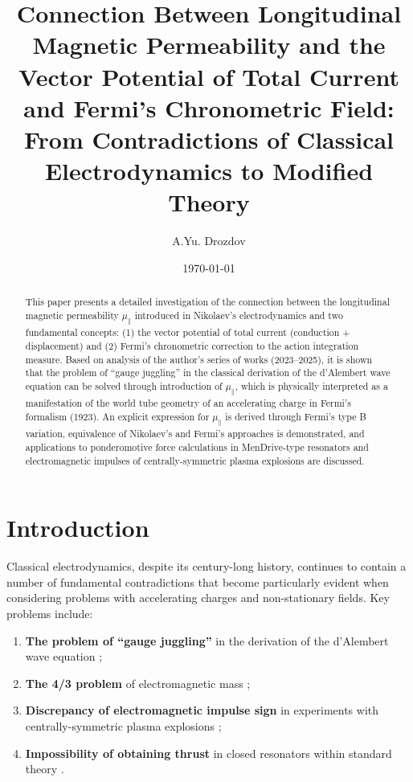 \documentclass[12pt, a4paper]{article}
\title{Connection Between Longitudinal Magnetic Permeability and the Vector Potential of Total Current and Fermi's Chronometric Field: From Contradictions of Classical Electrodynamics to Modified Theory}
\author{A.Yu. Drozdov}
\date{\today}
\begin{document}
\maketitle

\begin{abstract}
This paper presents a detailed investigation of the connection between the longitudinal magnetic permeability $\mu_{\parallel}$ introduced in Nikolaev's electrodynamics and two fundamental concepts: (1) the vector potential of total current (conduction + displacement) and (2) Fermi's chronometric correction to the action integration measure. Based on analysis of the author's series of works (2023--2025), it is shown that the problem of ``gauge juggling'' in the classical derivation of the d'Alembert wave equation can be solved through introduction of $\mu_{\parallel}$, which is physically interpreted as a manifestation of the world tube geometry of an accelerating charge in Fermi's formalism (1923). An explicit expression for $\mu_{\parallel}$ is derived through Fermi's type B variation, equivalence of Nikolaev's and Fermi's approaches is demonstrated, and applications to ponderomotive force calculations in MenDrive-type resonators and electromagnetic impulses of centrally-symmetric plasma explosions are discussed.
\end{abstract}

\section{Introduction}

Classical electrodynamics, despite its century-long history, continues to contain a number of fundamental contradictions that become particularly evident when considering problems with accelerating charges and non-stationary fields. Key problems include:

\begin{enumerate}
    \item \textbf{The problem of ``gauge juggling''} in the derivation of the d'Alembert wave equation \cite{JugglingCalibrations};
    \item \textbf{The 4/3 problem} of electromagnetic mass \cite{Fermi1923};
    \item \textbf{Discrepancy of electromagnetic impulse sign} in experiments with centrally-symmetric plasma explosions \cite{PlasmaExplosion};
    \item \textbf{Impossibility of obtaining thrust} in closed resonators within standard theory \cite{MenDrive}.
\end{enumerate}
\end{document}
